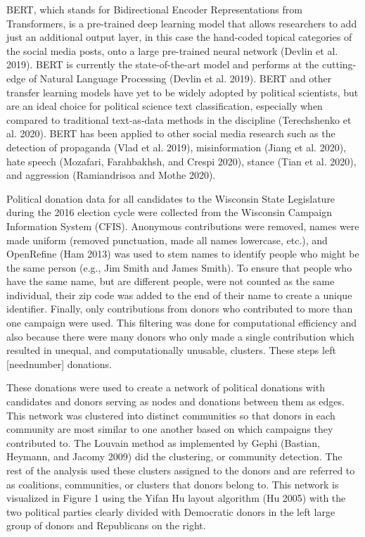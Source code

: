 \documentclass[12pt,]{article}
\begin{document}
BERT, which stands for Bidirectional Encoder Representations from
Transformers, is a pre-trained deep learning model that allows
researchers to add just an additional output layer, in this case the
hand-coded topical categories of the social media posts, onto a large
pre-trained neural network (Devlin et al. 2019). BERT is currently the
state-of-the-art model and performs at the cutting-edge of Natural
Language Processing (Devlin et al. 2019). BERT and other transfer
learning models have yet to be widely adopted by political scientists,
but are an ideal choice for political science text classification,
especially when compared to traditional text-as-data methods in the
discipline (Terechshenko et al. 2020). BERT has been applied to other
social media research such as the detection of propaganda (Vlad et al.
2019), misinformation (Jiang et al. 2020), hate speech (Mozafari,
Farahbakhsh, and Crespi 2020), stance (Tian et al. 2020), and aggression
(Ramiandrisoa and Mothe 2020).

Political donation data for all candidates to the Wisconsin State
Legislature during the 2016 election cycle were collected from the
Wisconsin Campaign Information System (CFIS). Anonymous contributions
were removed, names were made uniform (removed punctuation, made all
names lowercase, etc.), and OpenRefine (Ham 2013) was used to stem names
to identify people who might be the same person (e.g., Jim Smith and
James Smith). To ensure that people who have the same name, but are
different people, were not counted as the same individual, their zip
code was added to the end of their name to create a unique identifier.
Finally, only contributions from donors who contributed to more than one
campaign were used. This filtering was done for computational efficiency
and also because there were many donors who only made a single
contribution which resulted in unequal, and computationally unusable,
clusters. These steps left {[}neednumber{]} donations.

These donations were used to create a network of political donations
with candidates and donors serving as nodes and donations between them
as edges. This network was clustered into distinct communities so that
donors in each community are most similar to one another based on which
campaigns they contributed to. The Louvain method as implemented by
Gephi (Bastian, Heymann, and Jacomy 2009) did the clustering, or
community detection. The rest of the analysis used these clusters
assigned to the donors and are referred to as coalitions, communities,
or clusters that donors belong to. This network is visualized in Figure
1 using the Yifan Hu layout algorithm (Hu 2005) with the two political
parties clearly divided with Democratic donors in the left large group
of donors and Republicans on the right.
\end{document}
